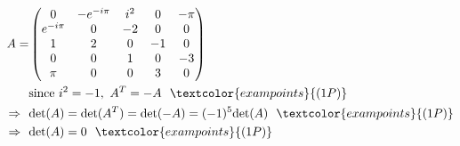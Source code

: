 {\color{solution}
\begin{align*}
A=&\begin{pmatrix}0&-e^{-i\pi}&i^2&0&-\pi\\e^{-i\pi}&0&-2&0&0\\1&2&0&-1&0\\0&0&1&0&-3\\\pi&0&0&3&0\end{pmatrix}\\
%
&\text{since}~i^2=-1,~A^T=-A~~\textcolor{exampoints}{(1P)}\\
\Rightarrow~~&\text{det}(A)=\text{det}(A^T)=\text{det}(-A)=(-1)^5\text{det}(A)~~\textcolor{exampoints}{(1P)}\\
\Rightarrow~~&\text{det}(A)=0~~\textcolor{exampoints}{(1P)}
\end{align*}
}